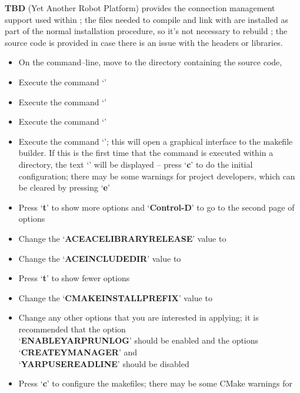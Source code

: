 \tertiaryEnd{}
\textbf{TBD}
\tertiaryEnd{}
\secondaryEnd{}
\textbf{\yarp} (Yet Another Robot Platform) provides the connection management support
used within \mplusm{}; the files needed to compile and link with \yarp{} are installed as
part of the normal \mplusm{} installation procedure, so it's not necessary to rebuild
\yarp{}; the source code is provided in case there is an issue with the headers or
libraries.
\begin{itemize}
\item On the command--line, move to the directory containing the \mplusm{} source code,
\item Execute the command `'
\item Execute the command `'
\item Execute the command `'
\item Execute the command `'; this will open a graphical interface to
the makefile builder. If this is the first time that the command is executed within a
directory, the text `' will be displayed -- press `\textbf{c}' to do
the initial configuration; there may be some warnings for project developers, which can be
cleared by pressing `\textbf{e}'
\item Press `\textbf{t}' to show more options and `\textbf{Control-D}' to go to the second
page of options
\item Change the `\textbf{ACE\fUS{}ACE\fUS{}LIBRARY\fUS{}RELEASE}' value to
\item Change the `\textbf{ACE\fUS{}INCLUDE\fUS{}DIR}' value to 
\item Press `\textbf{t}' to show fewer options
\item Change the `\textbf{CMAKE\fUS{}INSTALL\fUS{}PREFIX}' value to 
\item Change any other options that you are interested in applying; it is recommended that
the option\\
`\textbf{ENABLE\fUS{}YARPRUN\fUS{}LOG}' should be enabled and the options
`\textbf{CREATE\fUS{}YMANAGER}' and\\
`\textbf{YARP\fUS{}USE\fUS{}READLINE}' should be disabled
\item Press `\textbf{c}' to configure the makefiles; there may be some CMake warnings for

\end{itemize}
